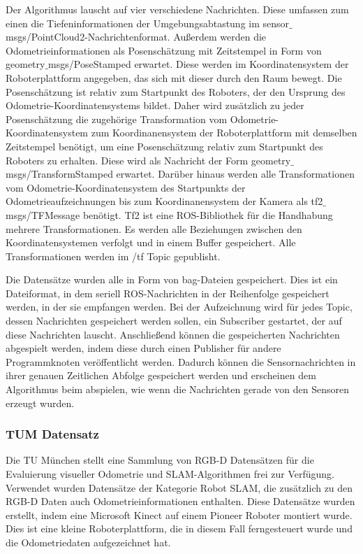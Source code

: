 Der Algorithmus lauscht auf vier verschiedene Nachrichten. Diese umfassen zum einen die Tiefeninformationen der Umgebungsabtastung im  sensor$\_$msgs/PointCloud2-Nachrichtenformat. Außerdem werden die Odometrieinformationen als Posenschätzung mit Zeitstempel in Form von geometry$\_$msgs/PoseStamped erwartet. Diese werden im Koordinatensystem der Roboterplattform angegeben, das sich mit dieser durch den Raum bewegt. Die Posenschätzung ist relativ zum Startpunkt des  Roboters, der den Ursprung des Odometrie-Koordinatensystems bildet. Daher wird zusätzlich zu jeder Posenschätzung die zugehörige Transformation vom Odometrie-Koordinatensystem zum Koordinanensystem der Roboterplattform mit demselben Zeitstempel benötigt, um eine Posenschätzung relativ zum Startpunkt des Roboters zu erhalten. Diese wird als Nachricht der Form geometry$\_$msgs/TransformStamped erwartet. Darüber hinaus werden alle Transformationen vom Odometrie-Koordinatensystem des Startpunkts der Odometrieaufzeichnungen bis zum Koordinanensystem der Kamera als tf2$\_$msgs/TFMessage benötigt. Tf2 ist eine ROS-Bibliothek für die Handhabung mehrere Transformationen. Es werden alle Beziehungen zwischen den Koordinatensystemen verfolgt und in einem Buffer gespeichert. Alle Transformationen werden im /tf Topic gepublisht. 

Die Datensätze wurden alle in Form von bag-Dateien gespeichert. Dies ist ein Dateiformat, in dem seriell ROS-Nachrichten in der Reihenfolge gespeichert werden, in der sie empfangen werden. Bei der Aufzeichnung wird für jedes Topic, dessen Nachrichten gespeichert werden sollen, ein Subscriber gestartet, der auf diese Nachrichten lauscht. Anschließend können die gespeicherten Nachrichten abgespielt werden, indem diese durch einen Publisher für andere Programmknoten veröffentlicht werden. Dadurch können die Sensornachrichten in ihrer genauen Zeitlichen Abfolge gespeichert werden und erscheinen dem Algorithmus beim abspielen, wie wenn die Nachrichten gerade von den Sensoren erzeugt wurden. 

\subsubsection{TUM Datensatz}

Die TU München stellt eine Sammlung von RGB-D Datensätzen für die Evaluierung visueller Odometrie und SLAM-Algorithmen frei zur Verfügung. Verwendet wurden Datensätze der Kategorie Robot SLAM, die zusätzlich zu den RGB-D Daten auch Odometrieinformationen enthalten. Diese Datensätze wurden erstellt, indem eine Microsoft Kinect auf einem Pioneer Roboter montiert wurde. Dies ist eine kleine Roboterplattform, die in diesem Fall ferngesteuert wurde und die Odometriedaten aufgezeichnet hat. 

